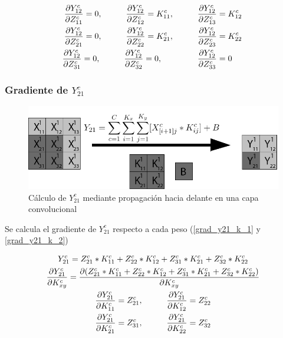 \begin{gather}
	\frac{\partial Y^c_{12}}{\partial Z^c_{11}} = 0, \hspace{10mm} \frac{\partial Y^c_{12}}{\partial Z^c_{12}} = K^c_{11}, \hspace{10mm} \frac{\partial Y^c_{12}}{\partial Z^c_{13}} = K^c_{12} \label{grad_y12_z_1} \\
	\frac{\partial Y^c_{12}}{\partial Z^c_{21}} = 0, \hspace{10mm} \frac{\partial Y^c_{12}}{\partial Z^c_{22}} = K^c_{21}, \hspace{10mm} \frac{\partial Y^c_{12}}{\partial Z^c_{23}} = K^c_{22} \label{grad_y12_z_2} \\
	\frac{\partial Y^c_{12}}{\partial Z^c_{31}} = 0, \hspace{10mm} \frac{\partial Y^c_{12}}{\partial Z^c_{32}} = 0, \hspace{15mm} \frac{\partial Y^c_{12}}{\partial Z^c_{33}} = 0 \hspace{5mm} \label{grad_y12_z_3}
\end{gather}

\subsubsection{Gradiente de $Y^c_{21}$}

\begin{figure}[H]
	\centering
	\includegraphics[width=1\linewidth]{imagenes/conv_ejemplo_backprop_3.jpg} 
	\caption{Cálculo de $Y^c_{21}$ mediante propagación hacia delante en una capa convolucional}
	\label{fig:ejemplo_3_forward_prop_convolucional}
\end{figure}

Se calcula el gradiente de $Y^c_{21}$ respecto a cada peso (\ref{grad_y21_k_1} y \ref{grad_y21_k_2})

\begin{gather}
	Y^c_{21} = Z^c_{21} * K^c_{11} + Z^c_{22} * K^c_{12} + Z^c_{31} * K^c_{21} + Z^c_{32} * K^c_{22} \\
	\frac{\partial Y^c_{21}}{\partial K^c_{xy}} = \frac{\partial (Z^c_{21} * K^c_{11} + Z^c_{22} * K^c_{12} + Z^c_{31} * K^c_{21} + Z^c_{32} * K^c_{22})}{\partial K^c_{xy}} \\
	\frac{\partial Y^c_{21}}{\partial K^c_{11}} = Z^c_{21}, \hspace{10mm} \frac{\partial Y^c_{21}}{\partial K^c_{12}} = Z^c_{22} \label{grad_y21_k_1} \\
	\frac{\partial Y^c_{21}}{\partial K^c_{21}} = Z^c_{31}, \hspace{10mm} \frac{\partial Y^c_{21}}{\partial K^c_{22}} = Z^c_{32} \label{grad_y21_k_2}
\end{gather}

